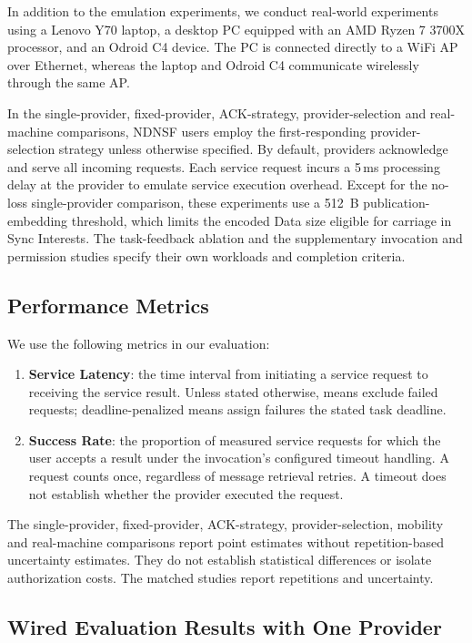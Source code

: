 In addition to the emulation experiments, we conduct real-world experiments using a Lenovo Y70 laptop, a desktop PC equipped with an AMD Ryzen 7 3700X processor, and an Odroid C4 device. The PC is connected directly to a WiFi AP over Ethernet, whereas the laptop and Odroid C4 communicate wirelessly through the same AP.

In the single-provider, fixed-provider, ACK-strategy, provider-selection and real-machine comparisons, NDNSF users employ the first-responding provider-selection strategy unless otherwise specified. By default, providers acknowledge and serve all incoming requests. Each service request incurs a 5\,ms processing delay at the provider to emulate service execution overhead. Except for the no-loss single-provider comparison, these experiments use a 512~B publication-embedding threshold, which limits the encoded Data size eligible for carriage in Sync Interests. The task-feedback ablation and the supplementary invocation and permission studies specify their own workloads and completion criteria.
\subsection{Performance Metrics}

We use the following metrics in our evaluation:

\begin{enumerate}
\item \textbf{Service Latency}: the time interval from initiating a service request to receiving the service result. Unless stated otherwise, means exclude failed requests; deadline-penalized means assign failures the stated task deadline.

\item \textbf{Success Rate}: the proportion of measured service requests for which the user accepts a result under the invocation's configured timeout handling. A request counts once, regardless of message retrieval retries. A timeout does not establish whether the provider executed the request.
\end{enumerate}

The single-provider, fixed-provider, ACK-strategy, provider-selection, mobility and real-machine comparisons report point estimates without repetition-based uncertainty estimates. They do not establish statistical differences or isolate authorization costs. The matched studies report repetitions and uncertainty.

\subsection{Wired Evaluation Results with One Provider}

